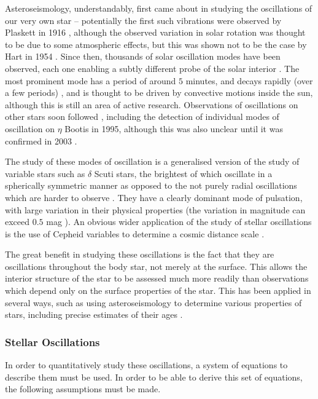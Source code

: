 \documentclass[11pt]{amsart}
\begin{document}
Asteroseismology, understandably, first came about in studying the oscillations of our very own star -- potentially the first such vibrations were observed by Plaskett in 1916 \cite{Plaskett1916}, although the  observed variation in solar rotation was thought to be due to some atmospheric effects, but this was shown not to be the case by Hart in 1954 \cite{Hart1954}.  Since then, thousands of solar oscillation modes have been observed, each one enabling a subtly different probe of the solar interior \cite{DiMauro2017}.  The most prominent mode has a period of around $5$ minutes, and decays rapidly (over a few periods) \cite{Ulrich1970},  and is thought to be driven by convective motions inside the sun, although this is still an area of active research.  Observations of oscillations on other stars soon followed \cite{Brown1991}, including the detection of individual modes of oscillation on $\eta$ Bootis in 1995, although this was also unclear until it was confirmed in 2003 \cite{Kjeldsen2003}.

The study of these modes of oscillation is a generalised version of the study of variable stars such as $\delta$ Scuti stars, the brightest of which oscillate in a spherically symmetric manner as opposed to the not purely radial oscillations which are harder to observe \cite{Garg2010}.  They have a clearly dominant mode of pulsation, with large variation in their physical properties (the variation in magnitude can exceed $0.5$ mag \cite{Garg2010}).  An obvious wider application of the study of stellar oscillations is the use of Cepheid variables to determine a cosmic distance scale \cite{Madore1991}.

The great benefit in studying these oscillations is the fact that they are oscillations throughout the body star, not merely at the surface.  This allows the interior structure of the star to be assessed much more readily than observations which depend only on the surface properties of the star.  This has been applied in several ways, such as using asteroseismology to determine various properties of stars, including precise estimates of their ages \cite{Chaplin2013} \cite{Cunha2007}.

\subsubsection{Stellar Oscillations} \label{Intro:StellarOsc}

In order to quantitatively study these oscillations, a system of equations to describe them must be used.  In order to be able to derive this set of equations, the following assumptions must be made.
\end{document}
